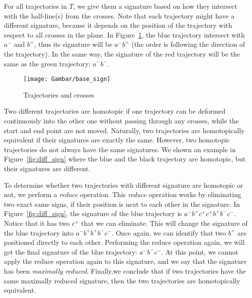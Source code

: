 For all trajectories in $T$, we give them a signature based on how they intersect with the half-line(s) from the crosses. 
Note that each trajectory might have a different signature, because it depends on the position of the trajectory with respect to all crosses in the plane.
In Figure~\ref{fig:base_sign}, the blue trajectory intersect with \textit{$a^{-}$} and \textit{$b^{+}$}, thus its signature will be \textit{$a^{-}b^{+}$} (the order is following the direction of the trajectory). 
In the same way, the signature of the red trajectory will be the same as the green trajectory: \textit{$a^{-}b^{-}$}.

\begin{figure}
\centering
\texttt{[image: Gambar/base\_sign]}
\caption[Trajectories and crosses]{Trajectories and crosses} 
\label{fig:base_sign}
\end{figure}


Two different trajectories are homotopic if one trajectory can be deformed continuously into the other one without passing through any crosses, while the start and end point are not moved.
Naturally, two trajectories are homotopically equivalent if their signatures are exactly the same. 
However, two homotopic trajectories do not always have the same signatures.
We shown an example in Figure~\ref{fig:diff_sign} where the blue and the black trajectory are homotopic, but their signatures are different.

To determine whether two trajectories with different signature are homotopic or not, we perform a \textit{reduce} operation.
This \textit{reduce} operation works by eliminating two exact same signs, if their position is next to each other in the signature.
In Figure~\ref{fig:diff_sign}, the signature of the blue trajectory is \textit{$a^{-}b^{+}c^{+}c^{+}b^{+}b^{-}c^{-}$}.
Notice that it has two \textit{$c^{+}$} that we can eliminate.
This will change the signature of the blue trajectory into \textit{$a^{-}b^{+}b^{+}b^{-}c^{-}$}.
Once again, we can identify that two \textit{$b^{+}$} are positioned directly to each other. 
Performing the reduce operation again, we will get the final signature of the blue trajectory: \textit{$a^{-}b^{-}c^{-}$}.
At this point, we cannot apply the reduce operation again to this signature, and we say that the signature has been \textit{maximally reduced}.
Finally,we conclude that if two trajectories have the same maximally reduced signature, then the two trajectories are homotopically equivalent.  

